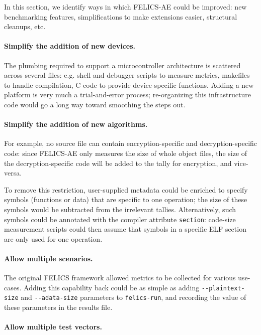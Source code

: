 \documentclass{article}
\begin{document}
In this section, we identify ways in which FELICS-AE could be
improved: new benchmarking features, simplifications to make
extensions easier, structural cleanups, etc.

\paragraph{Simplify the addition of new devices.}

The plumbing required to support a microcontroller architecture is
scattered across several files: e.g. shell and debugger scripts to
measure metrics, makefiles to handle compilation, C code to provide
device-specific functions.  Adding a new platform is very much a
trial-and-error process; re-organizing this infrastructure code would
go a long way toward smoothing the steps out.

\paragraph{Simplify the addition of new algorithms.}

For example, no source file can contain encryption-specific and
decryption-specific code: since FELICS-AE only measures the size of
whole object files, the size of the decryption-specific code will be
added to the tally for encryption, and vice-versa.

To remove this restriction, user-supplied metadata could be enriched
to specify symbols (functions or data) that are specific to one
operation; the size of these symbols would be subtracted from the
irrelevant tallies.  Alternatively, such symbols could be annotated
with the compiler attribute \texttt{section}: code-size measurement
scripts could then assume that symbols in a specific ELF section are
only used for one operation.

\paragraph{Allow multiple scenarios.}

The original FELICS framework allowed metrics to be collected for
various use-cases.  Adding this capability back could be as simple as
adding \texttt{-{}-plaintext-size} and \texttt{-{}-adata-size}
parameters to \texttt{felics-run}, and recording the value of these
parameters in the results file.

\paragraph{Allow multiple test vectors.}
\end{document}
